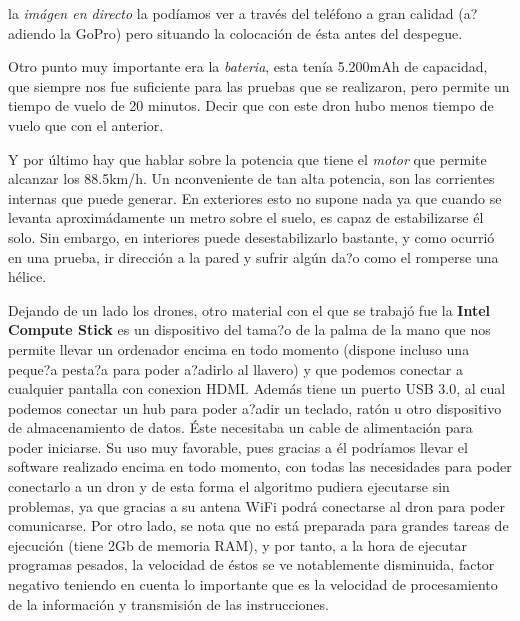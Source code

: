 \hspace{1 cm} la \textsl{im\'agen en directo} la pod\'iamos ver a trav\'es del tel\'efono a gran calidad (a?adiendo la GoPro) pero situando la colocaci\'on de \'esta antes del despegue.

\hspace{1 cm} Otro punto muy importante era la \textsl{bateria}, esta ten\'ia  5.200mAh de capacidad, que siempre nos fue suficiente para las pruebas que se realizaron, pero permite un tiempo de vuelo de 20 minutos. Decir que con este dron hubo menos tiempo de vuelo que con el anterior.

\hspace{1 cm} Y por \'ultimo hay que hablar sobre la potencia que tiene el \textsl{motor} que permite alcanzar los 88.5km/h. Un nconveniente de tan alta potencia, son las corrientes internas que puede generar. En exteriores esto no supone nada ya que cuando se levanta aproxim\'adamente un metro sobre el suelo, es capaz de estabilizarse \'el solo. Sin embargo, en interiores puede desestabilizarlo bastante, y como ocurri\'o en una prueba, ir direcci\'on a la pared y sufrir alg\'un da?o como el romperse una h\'elice.


\hspace{1 cm} Dejando de un lado los drones, otro material con el que se trabaj\'o fue la \textbf{Intel Compute Stick} es un dispositivo del tama?o de la palma de la mano que nos permite llevar un ordenador encima en todo momento (dispone incluso una peque?a pesta?a para poder a?adirlo al llavero) y que podemos conectar a cualquier pantalla con conexion HDMI. Adem\'as tiene un puerto USB 3.0, al cual podemos conectar un hub para poder a?adir un teclado, rat\'on u otro dispositivo de almacenamiento de datos. \'Este necesitaba un cable de alimentaci\'on para poder iniciarse. Su uso muy favorable, pues gracias a \'el podr\'iamos llevar el software realizado encima en todo momento, con todas las necesidades para poder conectarlo a un dron y de esta forma el algoritmo pudiera ejecutarse sin problemas, ya que gracias a su antena WiFi podr\'a conectarse al dron para poder comunicarse. Por otro lado, se nota que no est\'a preparada para grandes tareas de ejecuci\'on (tiene 2Gb de memoria RAM), y por tanto, a la hora de ejecutar programas pesados, la velocidad de \'estos se ve notablemente disminuida, factor negativo teniendo en cuenta lo importante que es la velocidad de procesamiento de la informaci\'on y transmisi\'on de las instrucciones. 

